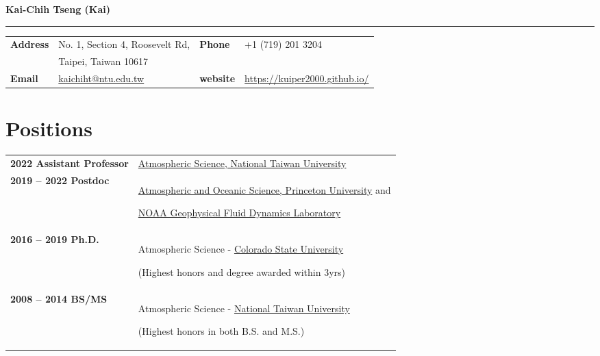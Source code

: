 \documentclass{article}
\begin{document}
{\huge\color{airforceblue}\textbf{Kai-Chih Tseng (Kai)}\par}
\rule{\textwidth}{0.5mm}\par

\vspace{5ex}

\begin{tabular}{
		>{\bfseries}p{.20\linewidth}
		p{.4\linewidth}
		>{\bfseries}p{.1\linewidth}
		p{.25\linewidth}
	}
	Address       & No. 1, Section 4, Roosevelt Rd,          &  Phone  & +1 (719) 201 3204\\
	              & Taipei, Taiwan 10617          &    &  \\
	Email         & \href{mailto:kaichiht@ntu.edu.tw}{kaichiht@ntu.edu.tw} & website & \href{https://kuiper2000.github.io/}{https://kuiper2000.github.io/}    \\
\end{tabular}

\section{\color{airforceblue}Positions}
\begin{tabular}{>{\bfseries}p{5cm}p{\linewidth-2.5cm\relax}}
	2022 Assistant Professor   & \href{https://www.princeton.edu/}{Atmospheric Science, National Taiwan University}\par 
	\\
	2019  -- 2022 Postdoc & \href{https://www.princeton.edu/}{Atmospheric and Oceanic Science, Princeton University} and \par \href{https://www.gfdl.noaa.gov/}{NOAA Geophysical Fluid Dynamics Laboratory} \par
    \\
	2016 -- 2019 Ph.D. & Atmospheric Science -
	\href{https://www.colostate.edu/}{Colorado State University} \par
	(Highest honors and degree awarded within 3yrs) \par
	\\
	2008 -- 2014 BS/MS & Atmospheric Science - \href{https://www.ntu.edu.tw/}{National Taiwan University} \par 
	(Highest honors in both B.S. and M.S.) 

\end{tabular}
\end{document}
